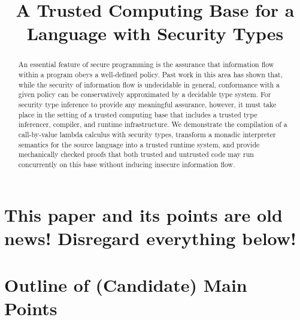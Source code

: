 \documentclass{article}
\title{A Trusted Computing Base for a Language with Security Types}
\begin{document}
\maketitle

\begin{abstract}
An essential feature of secure programming is the assurance that information
flow within a program obeys a well-defined policy. Past work in this area has
shown that, while the security of information flow is undecidable in general,
conformance with a given policy can be conservatively approximated by a
decidable type system.  For security type inference to provide any meaningful
assurance, however, it must take place in the setting of a trusted computing
base that includes a trusted type inferencer, compiler, and runtime
infrastructure.  We demonstrate the compilation of a call-by-value lambda
calculus with security types, transform a monadic interpreter semantics for
the source language into a trusted runtime system, and provide mechanically
checked proofs that both trusted and untrusted code may run concurrently
on this base without inducing insecure information flow.
\end{abstract}

\section{This paper and its points are old news!  Disregard everything below!}

\section{Outline of (Candidate) Main Points}
\end{document}
